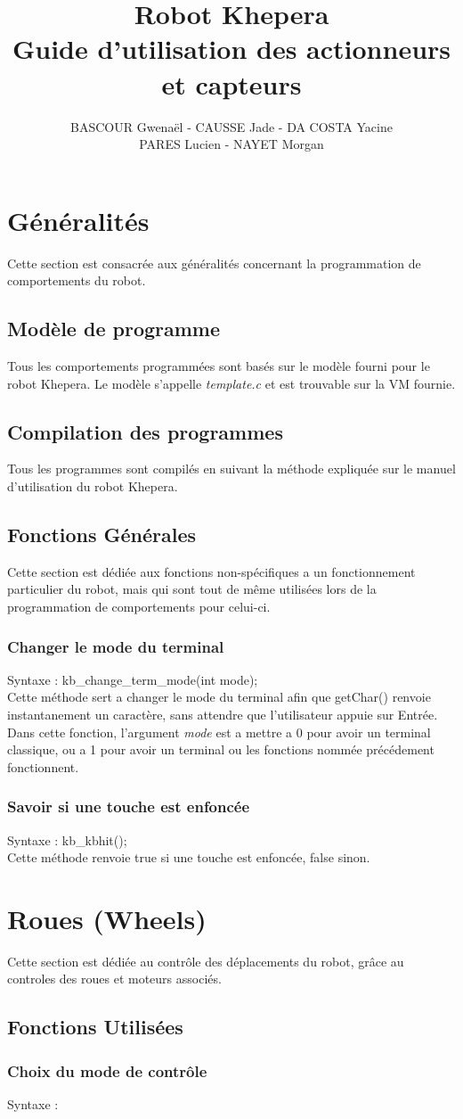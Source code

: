 \documentclass[english, 12pt]{article}
\author{BASCOUR Gwenaël - CAUSSE Jade -  DA COSTA Yacine\\PARES Lucien - NAYET Morgan}
\title{Robot Khepera \\ Guide d'utilisation des actionneurs et capteurs}
\begin{document}
	\maketitle
	\pagebreak
	\tableofcontents
	\pagebreak
	\section{Généralités}
		Cette section est consacrée aux généralités concernant la programmation de comportements du robot.
		\subsection{Modèle de programme}
			Tous les comportements programmées sont basés sur le modèle fourni pour le robot Khepera. Le modèle s'appelle \textit{template.c} et est trouvable sur la VM fournie.
		\subsection{Compilation des programmes}
			Tous les programmes sont compilés en suivant la méthode expliquée sur le manuel d'utilisation du robot Khepera.
		\subsection{Fonctions Générales}
			Cette section est dédiée aux fonctions non-spécifiques a un fonctionnement particulier du robot, mais qui sont tout de même utilisées lors de la programmation de comportements pour celui-ci.
			\subsubsection{Changer le mode du terminal}
				Syntaxe : kb\_change\_term\_mode(int mode);
				\\
				Cette méthode sert a changer le mode du terminal afin que getChar() renvoie instantanement un caractère, sans attendre que l'utilisateur appuie sur Entrée.
				Dans cette fonction, l'argument \textit{mode} est a mettre a 0 pour avoir un terminal classique, ou a 1 pour avoir un terminal ou les fonctions nommée précédement fonctionnent.
			\subsubsection{Savoir si une touche est enfoncée}
			Syntaxe : kb\_kbhit();
			\\
			Cette méthode renvoie true si une touche est enfoncée, false sinon.
	\section{Roues (Wheels)}
		Cette section est dédiée au contrôle des déplacements du robot, grâce au controles des roues et moteurs associés.
		\subsection{Fonctions Utilisées}
			\subsubsection{Choix du mode de contrôle}
			Syntaxe : 
		
		
\end{document}
